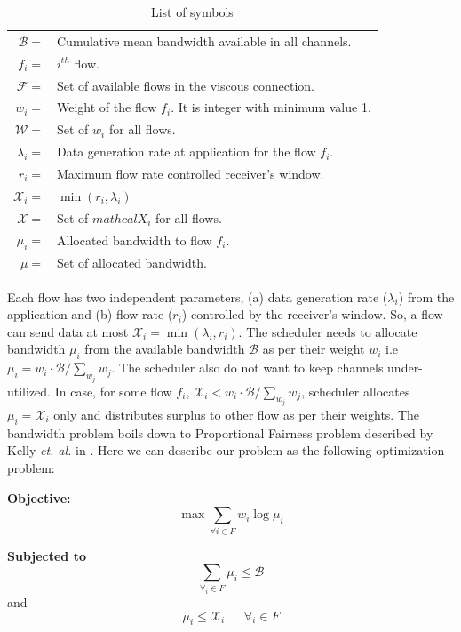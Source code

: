 \begin{table}
	\centering
	\begin{tabular}{|rl|}
		\hline
		$\mathcal{B} =$& Cumulative mean bandwidth available in all channels. \\
		$f_i =$& $i^{th}$ flow. \\
		$\mathcal{F} =$& Set of available flows in the viscous connection. \\
		$w_i =$& Weight of the flow $f_i$. It is integer with minimum value 1. \\
		$\mathcal{W} =$& Set of $w_i$ for all flows.\\
		$\lambda_i =$& Data generation rate at application for the flow $f_i$. \\
		$r_i =$& Maximum flow rate controlled receiver's window.\\
		$\mathcal{X}_i =$& $\min(r_i, \lambda_i)$\\
		$\mathcal{X} =$& Set of $mathcal{X}_i$ for all flows.\\
		$\mu_i =$& Allocated bandwidth to flow $f_i$.\\
		$\mathcal{\mu} =$& Set of allocated bandwidth.\\
		\hline
	\end{tabular}
	\caption{\label{table:proofsymbols}List of symbols}
\end{table}

Each flow has two independent parameters, (a) data generation rate ($\lambda_i$) from the application and (b) flow rate ($r_i$) controlled by the receiver's window. So, a flow can send data at most $\mathcal{X}_i = \min(\lambda_i, r_i)$. The scheduler needs to allocate bandwidth $\mu_i$ from the available bandwidth $\mathcal{B}$ as per their weight $w_i$ i.e $\mu_i = w_i \cdot \mathcal{B}/\sum_{w_j}w_j$. The scheduler also do not want to keep channels under-utilized. In case, for some flow $f_i$, $\mathcal{X}_i < w_i \cdot \mathcal{B}/\sum_{w_j}w_j$, scheduler allocates $\mu_i = \mathcal{X}_i$ only and distributes surplus to other flow as per their weights. The bandwidth problem boils down to Proportional Fairness problem described by Kelly {\it et. al.} in \cite{Kelly1998}. Here we can describe our problem as the following optimization problem:

{\bf Objective:} $$\max \sum_{\forall i \in F} w_i \log \mu_i$$

{\bf Subjected to } $$\sum_{\forall_i \in F}\mu_i \le \mathcal{B}$$
{and} $$\mu_i \le \mathcal{X}_i \ \ \ \ \ \ \ \forall_i \in F$$

